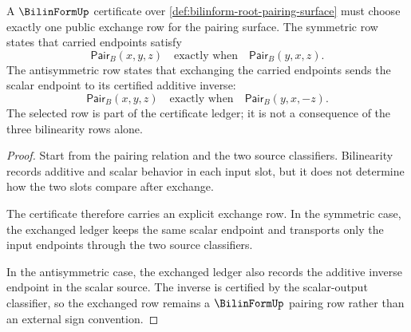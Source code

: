 \begin{theorem}
\label{thm:bilinform-root-symmetry-rows}
A $\BilinFormUp$ certificate over \autoref{def:bilinform-root-pairing-surface} must choose exactly one public exchange row for the pairing surface. The symmetric row states that carried endpoints satisfy
$$
\mathsf{Pair}_{B}(x,y,z)\quad\text{exactly when}\quad \mathsf{Pair}_{B}(y,x,z).
$$
The antisymmetric row states that exchanging the carried endpoints sends the scalar endpoint to its certified additive inverse:
$$
\mathsf{Pair}_{B}(x,y,z)\quad\text{exactly when}\quad \mathsf{Pair}_{B}(y,x,-z).
$$
The selected row is part of the certificate ledger; it is not a consequence of the three bilinearity rows alone.
\end{theorem}
\begin{proof}
Start from the pairing relation and the two source classifiers. Bilinearity records additive and scalar behavior in each input slot, but it does not determine how the two slots compare after exchange.

The certificate therefore carries an explicit exchange row. In the symmetric case, the exchanged ledger keeps the same scalar endpoint and transports only the input endpoints through the two source classifiers.

In the antisymmetric case, the exchanged ledger also records the additive inverse endpoint in the scalar source. The inverse is certified by the scalar-output classifier, so the exchanged row remains a $\BilinFormUp$ pairing row rather than an external sign convention.
\end{proof}


